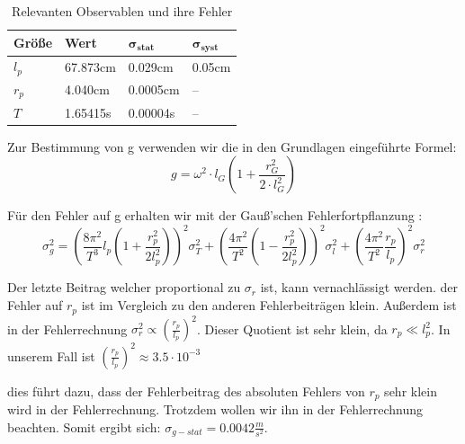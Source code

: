 \documentclass[twoside]{protokoll}
\begin{document}
\begin{table}[H]
        \centering
        \begin{tabularx}{1.0\textwidth}{X X X X} %
            \toprule
            \textbf{Größe} & \textbf{Wert} & $\mathbf{\sigma_{stat}}$ & $\mathbf{\sigma_{syst}}$ \\
            \midrule
            $l_p$ & 67.873cm & 0.029cm & 0.05cm \\
            $r_p$ & 4.040cm & 0.0005cm & --\\
            $T$ & 1.65415s & 0.00004s & --\\
            \bottomrule
        \end{tabularx}
        \caption{Relevanten Observablen und ihre Fehler}
        \label{tab:längen un fehler}
    \end{table}
    
 Zur Bestimmung von g verwenden wir die in den Grundlagen eingeführte Formel:
\begin{equation}
    g = \omega^2 \cdot l_G \left( 1 + \frac{r_G^2}{2 \cdot l_G^2} \right)
    \label{firm:pendel_g}
\end{equation}

Für den Fehler auf g erhalten wir mit der Gauß'schen Fehlerfortpflanzung :
\begin{equation}
\sigma_g^2 = \left(\frac{8\pi^2}{T^3}l_p\left(1+\frac{r_p^2}{2l_p^2}\right)\right)^2 \sigma_T^2 + \left(\frac{4\pi^2}{T^2}\left(1-\frac{r_p^2}{2l_p^2}\right)\right)^2\sigma_l^2 + \left(\frac{4\pi^2}{T^2}\frac{r_p}{l_p}\right)^2\sigma_r^2 
\end{equation}

Der letzte Beitrag welcher proportional zu $\sigma_r$ ist, kann vernachlässigt werden. 
der Fehler auf $r_p$ ist im Vergleich zu den anderen Fehlerbeiträgen klein. 
Außerdem ist in der Fehlerrechnung $\sigma_r^2 \propto \left(\frac{r_p}{l_p}\right)^2$.
Dieser Quotient ist sehr klein, da $ r_p \ll l_p^2 $. 
In unserem Fall ist $\left(\frac{r_p}{l_p}\right)^2 \approx 3.5\cdot10^{-3} $

dies führt dazu, dass der Fehlerbeitrag des absoluten Fehlers von $r_p$ sehr klein wird in der Fehlerrechnung.
Trotzdem wollen wir ihn in der Fehlerrechnung beachten. Somit ergibt sich: $\sigma_{g-stat} = 0.0042 \frac{m}{s^2}$.
\end{document}
